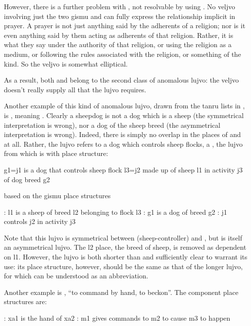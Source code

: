 However, there is a further problem with , not
    resolvable by using . No veljvo involving just the
    two gismu  and  can fully express the
    relationship implicit in prayer. A prayer is not just anything
    said by the adherents of a religion; nor is it even anything
    said by them acting as adherents of that religion. Rather, it
    is what they say under the authority of that religion, or using
    the religion as a medium, or following the rules associated
    with the religion, or something of the kind. So the veljvo is
    somewhat elliptical.

As a result, both  and  belong to
    the second class of anomalous lujvo: the veljvo doesn't really
    supply all that the lujvo requires.

Another example of this kind of anomalous lujvo, drawn from
    the tanru lists in , is
    , meaning . Clearly a sheepdog is not a
    dog which is a sheep (the symmetrical interpretation is wrong),
    nor a dog of the sheep breed (the asymmetrical interpretation
    is wrong). Indeed, there is simply no overlap in the places of
     and  at all. Rather, the lujvo refers to a
    dog which controls sheep flocks, a ,
    the lujvo from which is  with place
    structure:
\begin{example}
g1=j1 is a dog that controls sheep flock l3=j2\n
\T	made up of sheep l1 in activity j3 of dog breed g2
\end{example}

{\noindent}based on the gismu place structures
\begin{example}
: l1 is a sheep of breed l2 belonging to flock l3\n
{}: g1 is a dog of breed g2\n
{}: j1 controls j2 in activity j3
\end{example}

Note that this lujvo is symmetrical between 
    (sheep-controller) and , but  is itself an
    asymmetrical lujvo. The l2 place, the breed of sheep, is
    removed as dependent on l1. However, the lujvo  is
    both shorter than  and sufficiently clear to
    warrant its use: its place structure, however, should be the
    same as that of the longer lujvo, for which  can be
    understood as an abbreviation.

Another example is , ``to command by hand, to
    beckon''. The component place structures are:
\begin{example}
: xa1 is the hand of xa2\n
{}: m1 gives commands to m2 to cause m3 to happen
\end{example}

